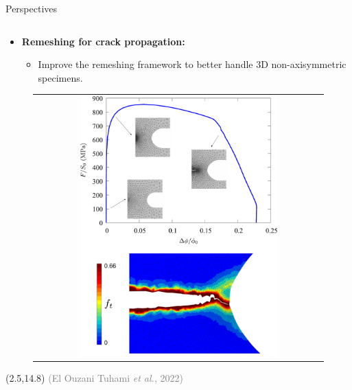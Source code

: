 \documentclass[9pt]{beamer}
\begin{document}

\begin{frame}{Perspectives}

    \begin{columns}

        \begin{column}{0.5\textwidth}
        
        \begin{itemize}
        	\item \textbf{Remeshing for crack propagation:}
        	\vspace{0.15cm}
			\begin{itemize}
				\item Improve the remeshing framework to better handle 3D non-axisymmetric specimens.
			\end{itemize}			        	
        \end{itemize}
        	\begin{figure}
        		\begin{tabular}{c}
            		\includegraphics[width=0.7\textwidth]{Images/remeshing_ST.pdf} \\
        		\end{tabular}
    		\end{figure}
    		
    \begin{textblock}{6}(2.5,14.8)
        \textcolor{gray}{\scriptsize (El Ouzani Tuhami \textit{et al.}, 2022)}
   	\end{textblock}
    		

\end{column}
\end{columns}
\end{frame}
\end{document}
